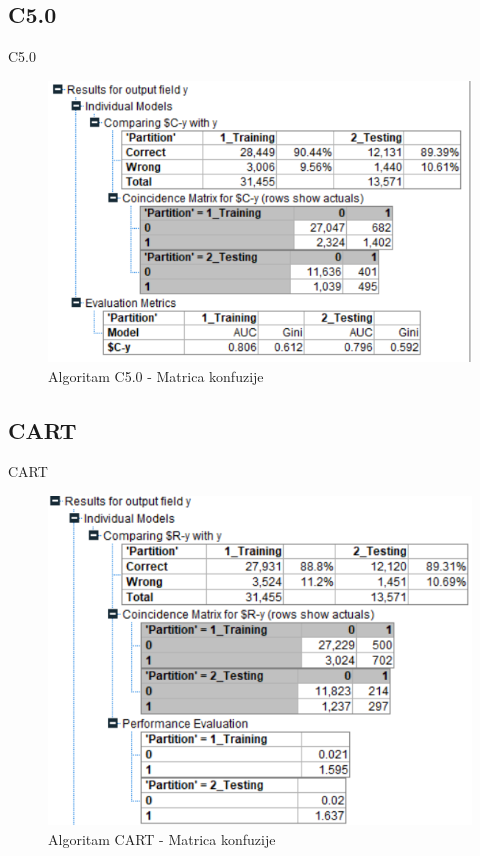 \documentclass{beamer}
\begin{document}
\subsection{C5.0}
\begin{frame}{C5.0}
    \begin{figure}[h!]
                \begin{center}
                \includegraphics[scale=0.60]{c5_matrix.png}
                \end{center}
                \caption{Algoritam C5.0 - Matrica konfuzije}
             \end{figure}
\end{frame}

\subsection{CART}
\begin{frame}{CART}
    \begin{figure}[h!]
                \begin{center}
                \includegraphics[scale=0.60]{cart_matrix.png}
                \end{center}
                \caption{Algoritam CART - Matrica konfuzije}
             \end{figure}
\end{frame}
\end{document}
